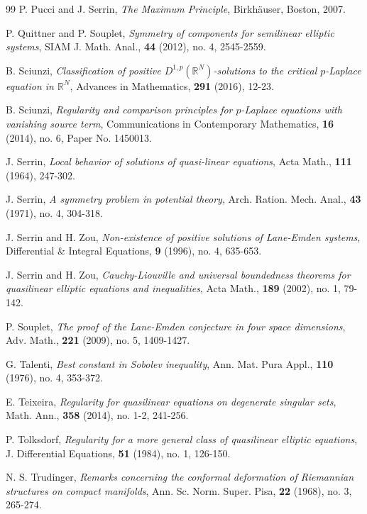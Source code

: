 \documentclass[12pt]{amsart}
\theoremstyle{definition}
\theoremstyle{remark}
\theoremstyle{conclusion}
\theoremstyle{conjecture}
\numberwithin{equation}{section}
\newcommand{\R}{\mathbb{R}}
\begin{document}
\begin{thebibliography}{99}
 P. Pucci and J. Serrin, {\it The Maximum Principle}, Birkh\"{a}user, Boston, 2007.

 P. Quittner and P. Souplet, {\it Symmetry of components for semilinear elliptic systems}, SIAM J. Math. Anal., \textbf{44} (2012), no. 4, 2545-2559.

 B. Sciunzi, {\it Classification of positive $D^{1,p}(\R^N)$-solutions to the critical $p$-Laplace equation in $\R^N$}, Advances in Mathematics, \textbf{291} (2016), 12-23.

 B. Sciunzi, {\it Regularity and comparison principles for $p$-Laplace equations with vanishing source term}, Communications in Contemporary Mathematics, \textbf{16} (2014), no. 6, Paper No. 1450013.

 J. Serrin, {\it Local behavior of solutions of quasi-linear equations}, Acta Math., \textbf{111} (1964), 247-302.

 J. Serrin, {\it A symmetry problem in potential theory}, Arch. Ration. Mech. Anal., \textbf{43} (1971), no. 4, 304-318.

 J. Serrin and H. Zou, {\it Non-existence of positive solutions of Lane-Emden systems}, Differential \& Integral Equations, \textbf{9} (1996), no. 4, 635-653.

 J. Serrin and H. Zou, {\it Cauchy-Liouville and universal boundedness theorems for quasilinear elliptic equations and inequalities}, Acta Math., \textbf{189} (2002), no. 1, 79-142.

 P. Souplet, {\it The proof of the Lane-Emden conjecture in four space dimensions}, Adv. Math., \textbf{221} (2009), no. 5, 1409-1427.

 G. Talenti, {\it Best constant in Sobolev inequality}, Ann. Mat. Pura Appl., \textbf{110} (1976), no. 4, 353-372.

 E. Teixeira, {\it Regularity for quasilinear equations on degenerate singular sets}, Math. Ann., \textbf{358} (2014), no. 1-2, 241-256.

 P. Tolksdorf, {\it Regularity for a more general class of quasilinear elliptic equations}, J. Differential Equations, \textbf{51} (1984), no. 1, 126-150.

 N. S. Trudinger, {\it Remarks concerning the conformal deformation of Riemannian structures on compact manifolds}, Ann. Sc. Norm. Super. Pisa, \textbf{22} (1968), no. 3, 265-274.


\end{thebibliography}
\end{document}
